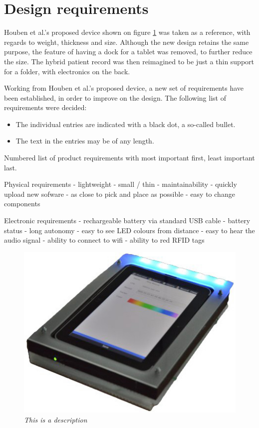 \section{Design requirements}

Houben et al.'s proposed device shown on figure \ref{fig:old-hypr} was taken as a reference, with regards to weight, thickness and size. Although the new design retains the same purpose, the feature of having a dock for a tablet was removed, to further reduce the size. The hybrid patient record was then reimagined to be just a thin support for a folder, with electronics on the back. 

Working from Houben et al.'s proposed device, a new set of requirements have been established, in order to improve on the design. The following list of requirements were decided:

\begin{itemize} \itemsep0em
  \item The individual entries are indicated with a black dot, a so-called bullet.
  \item The text in the entries may be of any length.
\end{itemize}

Numbered list of product requirements with most important first, least important last.

Physical requirements
- lightweight
- small / thin
- maintainability 
	- quickly upload new sofware
	- as close to pick and place as possible
	- easy to change components

Electronic requirements
- rechargeable battery via standard USB cable
- battery status
- long autonomy 
- easy to see LED colours from distance
- easy to hear the audio signal
- ability to connect to wifi
- ability to red RFID tags

\begin{figure}[h]
\begin{center}
\includegraphics[scale=.5]{figures/old-hypr.jpg}
\caption{\small {\it {This is a description}}} \label{fig:old-hypr}
\end{center}
\end{figure}